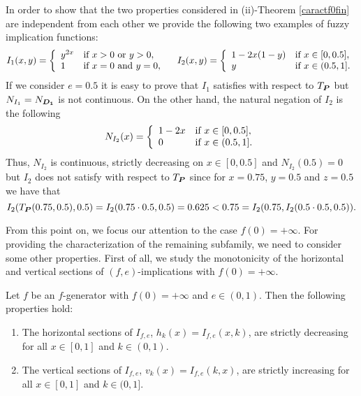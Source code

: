 \begin{remark} In order to show that the two properties considered in (ii)-Theorem \ref{caractf0fin} are independent from each other we provide the following two examples of fuzzy implication functions:
	$$I_1(x,y)= \left\{\begin{array}{ll} y^{2x}& \hbox{if } x>0 \hbox{ or } y>0,\\ 1&\hbox{if } x=0 \hbox{ and } y=0,\end{array}\right. \quad I_2(x,y)= \left\{\begin{array}{ll} 1-2x(1-y)& \hbox{if } x \in [0,0.5],\\ y&\hbox{if } x \in (0.5,1].\end{array}\right.$$
	If we consider $e=0.5$ it is easy to prove that $I_1$ satisfies \LIey with respect to $T_{\bm{P}}$ but $N_{I_1}=N_{\bm{D_1}}$ is not continuous. On the other hand, the natural negation of $I_2$ is the following
	$$N_{I_2}(x)=\left\{\begin{array}{ll} 1-2x& \hbox{if } x \in [0,0.5],\\ 0&\hbox{if } x \in (0.5,1].\end{array}\right.$$
	Thus, $N_{I_2}$ is continuous, strictly decreasing on $x \in [0,0.5]$ and $N_{I_2}(0.5)=0$ but $I_2$ does not satisfy \LIey with respect to $T_{\bm{P}}$ since for $x=0.75$, $y=0.5$ and $z=0.5$ we have that
	$$I_2(T_{\bm{P}}(0.75,0.5),0.5)=I_2(0.75 \cdot 0.5, 0.5)=0.625 < 0.75 =I_2(0.75, I_2(0.5 \cdot 0.5,0.5)).$$
\end{remark}

From this point on, we focus our attention to the case $f(0)=+\infty$. For providing the characterization of the remaining subfamily, we need to consider some other properties. First of all, we study the monotonicity of the horizontal and vertical sections of $(f,e)$-implications with  $f(0)=+\infty$.


\begin{lemma}\label{lema-previ}
	Let $f$ be an $f$-generator with $f(0)=+\infty$ and $e\in(0,1)$. Then the following properties hold:
	\begin{enumerate}[label=(\roman*)]
		\item The horizontal sections of $I_{f,e}$, $h_k(x)=I_{f,e}(x,k)$, are strictly decreasing for all $x\in[0,1]$ and $k\in(0,1)$.
		\item The vertical sections of $I_{f,e}$, $v_k(x)=I_{f,e}(k,x)$, are strictly increasing for all $x\in[0,1]$ and $k\in(0,1]$.
	\end{enumerate}
\end{lemma}

